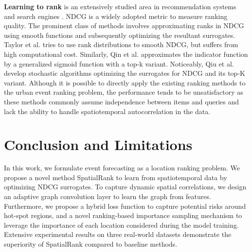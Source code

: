 \documentclass{article}
\begin{document}
{%
\textbf{Learning to rank} is an extensively studied area in recommendation systems and search engines \cite{liu2011learning}. NDCG is a widely adopted metric to measure ranking quality. The prominent class of methods involves approximating ranks in NDCG using smooth functions and subsequently optimizing the resultant surrogates. Taylor et al. \cite{SoftRank} tries to use rank distributions to smooth NDCG, but suffers from high computational cost. Similarly, Qin et al. \cite{ApproxNDCG} approximates the indicator function by a generalized sigmoid function with a top-k variant. Noticeably, Qiu et al. \cite{Qiu2022LargescaleSO} develop stochastic algorithms optimizing the surrogates for NDCG and its top-K variant. Although it is possible to directly apply the existing ranking methods to the urban event ranking problem, the performance tends to be unsatisfactory as these methods commonly assume independence between items and queries and lack the ability to handle spatiotemporal autocorrelation in the data. %


\section{Conclusion and Limitations}

In this work, we formulate event forecasting as a location ranking problem. We propose a novel method SpatialRank to learn from spatiotemporal data by optimizing NDCG surrogates. To capture dynamic spatial correlations, we design an adaptive graph convolution layer to learn the graph from features. Furthermore, we propose a hybrid loss function to capture potential risks around hot-spot regions, and a novel ranking-based importance sampling mechanism to leverage the importance of each location considered during the model training. Extensive experimental results on three real-world datasets demonstrate the superiority of SpatialRank compared to baseline methods.

}
\end{document}
